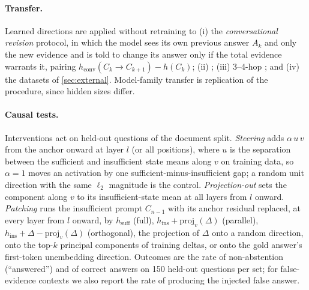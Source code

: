 \paragraph{Transfer.}
Learned directions are applied without retraining to (i) the \emph{conversational revision} protocol, in which the model sees its own previous answer $A_k$ and only the new evidence and is told to change its answer only if the total evidence warrants it, pairing $h_{\text{conv}}(C_k\to C_{k+1})-h(C_k)$; (ii) \twowiki{}; (iii) 3--4-hop \musique{}; and (iv) the datasets of \cref{sec:external}. Model-family transfer is replication of the procedure, since hidden sizes differ.

\paragraph{Causal tests.}
Interventions act on held-out questions of the document split. \emph{Steering} adds $\alpha\,u\,v$ from the anchor onward at layer $l$ (or all positions), where $u$ is the separation between the sufficient and insufficient state means along $v$ on training data, so $\alpha=1$ moves an activation by one sufficient-minus-insufficient gap; a random unit direction with the same $\ell_2$ magnitude is the control. \emph{Projection-out} sets the component along $v$ to its insufficient-state mean at all layers from $l$ onward. \emph{Patching} runs the insufficient prompt $C_{n-1}$ with its anchor residual replaced, at every layer from $l$ onward, by $h_{\text{suff}}$ (full), $h_{\text{ins}}+\mathrm{proj}_v(\Delta)$ (parallel), $h_{\text{ins}}+\Delta-\mathrm{proj}_v(\Delta)$ (orthogonal), the projection of $\Delta$ onto a random direction, onto the top-$k$ principal components of training deltas, or onto the gold answer's first-token unembedding direction. Outcomes are the rate of non-abstention (``answered'') and of correct answers on 150 held-out questions per set; for false-evidence contexts we also report the rate of producing the injected false answer.
